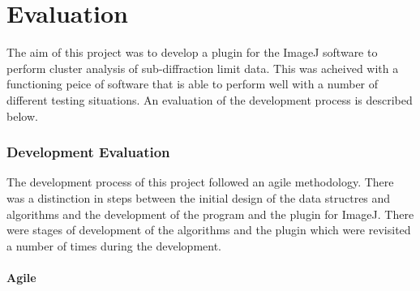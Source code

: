 
\part{Evaluation}
\label{prt:evaluation}

The aim of this project was to develop a plugin for the ImageJ software to
perform cluster analysis of sub-diffraction limit data. This was acheived with
a functioning peice of software that is able to perform well with a number of
different testing situations. An evaluation of the development process is
described below.

\section{Development Evaluation}
\label{sec:development_evaluation}

The development process of this project followed an agile methodology. There
was a distinction in steps between the initial design of the data structres and
algorithms and the development of the program and the plugin for ImageJ. There
were stages of development of the algorithms and the plugin which were
revisited a number of times during the development.

\subsection{Agile}
\label{sub:agile}

